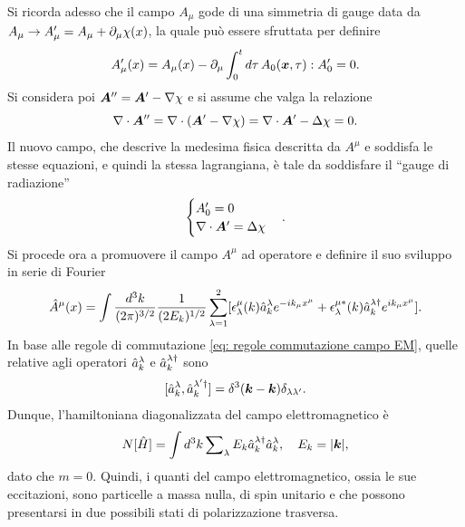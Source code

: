 Si ricorda adesso che il campo $A_\mu$ gode di una simmetria di gauge data da $A_\mu \to A_\mu' = A_\mu + \partial_\mu\chi(x)$, la quale può essere sfruttata per definire 
\begin{equation}
    A_\mu'(x) = A_\mu(x) -\partial_\mu\int_0^td\tau\,A_0(\bm{x},\tau) : A_0' = 0.
\end{equation}
Si considera poi $\bm{A}'' = \bm{A}' - \nabla\chi$ e si assume che valga la relazione
\begin{equation}
    \nabla\cdot\bm{A}'' = \nabla\cdot(\bm{A}' - \nabla\chi) = \nabla\cdot\bm{A}' - \Delta\chi = 0.
\end{equation}
Il nuovo campo, che descrive la medesima fisica descritta da $A^\mu$ e soddisfa le stesse equazioni, e quindi la stessa lagrangiana, è tale da soddisfare il ``gauge di radiazione''
\begin{equation}
\label{eq: gauge di radiazione}
    \begin{cases}
        A_0' = 0\\
        \nabla\cdot\bm{A}' = \Delta\chi
    \end{cases}.
\end{equation}
Si procede ora a promuovere il campo $A^\mu$ ad operatore e definire il suo sviluppo in serie di Fourier
\begin{equation}
\label{eq: operatore campo EM}
    \hat{A}^\mu(x) = \int\frac{d^3k}{(2\pi)^{3/2}}\frac{1}{(2E_k)^{1/2}}\sum_{\lambda = 1}^2[\epsilon_\lambda^\mu(k)\hat{a}_k^\lambda e^{-ik_\mu x^\mu} + \epsilon_\lambda^{\mu*}(k)\hat{a}_k^{\lambda\dagger} e^{ik_\mu x^\mu}].
\end{equation}
In base alle regole di commutazione \eqref{eq: regole commutazione campo EM}, quelle relative agli operatori $\hat{a}_k^\lambda$ e $\hat{a}_k^{\lambda\dagger}$ sono
\begin{equation}
    [\hat{a}^\lambda_k,\hat{a}_k^{\lambda'\dagger}] = \delta^3(\bm{k} - \bm{k})\delta_{\lambda\lambda'}.
\end{equation}
Dunque, l'hamiltoniana diagonalizzata del campo elettromagnetico è
\begin{equation}
    N[\hat{H}] = \int d^3k\sum\nolimits_\lambda E_k\hat{a}_k^{\lambda\dagger}\hat{a}_k^\lambda,\quad E_k = |\bm{k}|,
\end{equation}
dato che $m = 0$. Quindi, i quanti del campo elettromagnetico, ossia le sue eccitazioni, sono particelle a massa nulla, di spin unitario e che possono presentarsi in due possibili stati di polarizzazione trasversa. 

